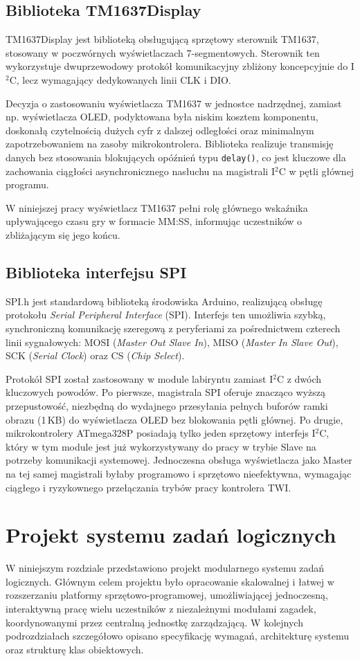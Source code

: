\documentclass{SGGW-thesis}
\begin{document}
\section{Biblioteka TM1637Display}
TM1637Display \cite{TM1637Display} jest biblioteką obsługującą sprzętowy sterownik TM1637, stosowany w poczwórnych wyświetlaczach 7-segmentowych. Sterownik ten wykorzystuje dwuprzewodowy protokół komunikacyjny zbliżony koncepcyjnie do I$^2$C, lecz wymagający dedykowanych linii CLK i DIO.

Decyzja o zastosowaniu wyświetlacza TM1637 w jednostce nadrzędnej, zamiast np. wyświetlacza OLED, podyktowana była niskim kosztem komponentu, doskonałą czytelnością dużych cyfr z dalszej odległości oraz minimalnym zapotrzebowaniem na zasoby mikrokontrolera. Biblioteka realizuje transmisję danych bez stosowania blokujących opóźnień typu \texttt{delay()}, co jest kluczowe dla zachowania ciągłości asynchronicznego nasłuchu na magistrali I$^2$C w pętli głównej programu.

W niniejszej pracy wyświetlacz TM1637 pełni rolę głównego wskaźnika upływającego czasu gry w formacie MM:SS, informując uczestników o zbliżającym się jego końcu.

\section{Biblioteka interfejsu SPI}
SPI.h jest standardową biblioteką środowiska Arduino, realizującą obsługę protokołu \textit{Serial Peripheral Interface} (SPI). Interfejs ten umożliwia szybką, synchroniczną komunikację szeregową z peryferiami za pośrednictwem czterech linii sygnałowych: MOSI (\textit{Master Out Slave In}), MISO (\textit{Master In Slave Out}), SCK (\textit{Serial Clock}) oraz CS (\textit{Chip Select}).

Protokół SPI został zastosowany w module labiryntu zamiast I$^2$C z dwóch kluczowych powodów. Po pierwsze, magistrala SPI oferuje znacząco wyższą przepustowość, niezbędną do wydajnego przesyłania pełnych buforów ramki obrazu (1\,KB) do wyświetlacza OLED bez blokowania pętli głównej. Po drugie, mikrokontrolery ATmega328P posiadają tylko jeden sprzętowy interfejs I$^2$C, który w tym module jest już wykorzystywany do pracy w trybie Slave na potrzeby komunikacji systemowej. Jednoczesna obsługa wyświetlacza jako Master na tej samej magistrali byłaby programowo i sprzętowo nieefektywna, wymagając ciągłego i ryzykownego przełączania trybów pracy kontrolera TWI.

\chapter{Projekt systemu zadań logicznych}
W niniejszym rozdziale przedstawiono projekt modularnego systemu zadań logicznych. Głównym celem projektu było opracowanie skalowalnej i łatwej w rozszerzaniu platformy sprzętowo-programowej, umożliwiającej jednoczesną, interaktywną pracę wielu uczestników z niezależnymi modułami zagadek, koordynowanymi przez centralną jednostkę zarządzającą. W kolejnych podrozdziałach szczegółowo opisano specyfikację wymagań, architekturę systemu oraz strukturę klas obiektowych.
\end{document}
